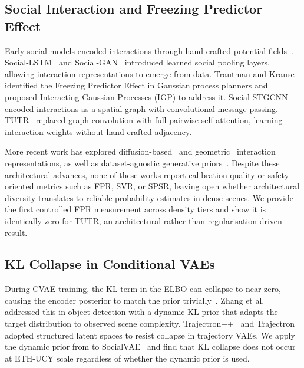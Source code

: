 \documentclass{article}
\begin{document}
\subsection{Social Interaction and Freezing Predictor Effect}

Early social models encoded interactions through hand-crafted potential
fields~\cite{helbing1995social}. Social-LSTM~\cite{alahi2016social} and
Social-GAN~\cite{gupta2018social} introduced learned social pooling layers,
allowing interaction representations to emerge from data. Trautman and
Krause~\cite{trautman2010unfreezing} identified the Freezing Predictor Effect
in Gaussian process planners and proposed Interacting Gaussian Processes (IGP)
to address it. Social-STGCNN~\cite{mohamed2020social} encoded interactions as
a spatial graph with convolutional message passing. TUTR~\cite{shi2023tutr}
replaced graph convolution with full pairwise self-attention, learning
interaction weights without hand-crafted adjacency.

More recent work has explored diffusion-based~\cite{liu2024diftraj} and
geometric~\cite{wong2024socialcircle} interaction representations, as well as
dataset-agnostic generative priors~\cite{bae2024singular}. Despite these
architectural advances, none of these works report calibration quality or
safety-oriented metrics such as FPR, SVR, or SPSR, leaving open whether
architectural diversity translates to reliable probability estimates in dense
scenes. We provide the first controlled FPR measurement across density tiers
and show it is identically zero for TUTR, an architectural rather than
regularisation-driven result.

\subsection{KL Collapse in Conditional VAEs}

During CVAE training, the KL term in the ELBO can collapse to near-zero,
causing the encoder posterior to match the prior trivially~\cite{lucas2019elbo}.
Zhang et al.~\cite{zhang2025openworld} addressed this in object detection with
a dynamic KL prior that adapts the target distribution to observed scene
complexity. Trajectron++~\cite{salzmann2020trajectron} and
Trajectron~\cite{ivanovic2019trajectron} adopted structured latent spaces to
resist collapse in trajectory VAEs. We apply the dynamic prior from
\citet{zhang2025openworld} to SocialVAE~\cite{xu2022socialvae} and find that
KL collapse does not occur at ETH-UCY scale regardless of whether the dynamic
prior is used.
\end{document}

